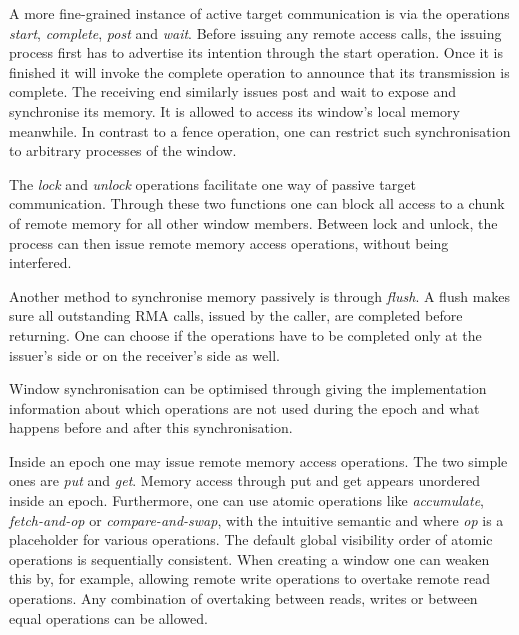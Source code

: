 \documentclass[a4paper, 10pt]{article}
\begin{document}
A more fine-grained instance of active target communication is via the operations \emph{start}, \emph{complete}, \emph{post} and \emph{wait}. Before issuing any remote access calls, the issuing process first has to advertise its intention through the start operation. Once it is finished it will invoke the complete operation to announce that its transmission is complete. The receiving end similarly issues post and wait to expose and synchronise its memory. It is allowed to access its window's local memory meanwhile. In contrast to a fence operation, one can restrict such synchronisation to arbitrary processes of the window.

The \emph{lock} and \emph{unlock} operations facilitate one way of passive target communication. Through these two functions one can block all access to a chunk of remote memory for all other window members. Between lock and unlock, the process can then issue remote memory access operations, without being interfered.

Another method to synchronise memory passively is through \emph{flush}. A flush makes sure all outstanding RMA calls, issued by the caller, are completed before returning. One can choose if the operations have to be completed only at the issuer's side or on the receiver's side as well.

Window synchronisation can be optimised through giving the implementation information about which operations are not used during the epoch and what happens before and after this synchronisation.

Inside an epoch one may issue remote memory access operations. The two simple ones are \emph{put} and \emph{get}. Memory access through put and get appears unordered inside an epoch.
Furthermore, one can use atomic operations like \emph{accumulate}, \emph{fetch-and-op} or \emph{compare-and-swap}, with the intuitive semantic and where \emph{op} is a placeholder for various operations. The default global visibility order of atomic operations is sequentially consistent. When creating a window one can weaken this by, for example, allowing remote write operations to overtake remote read operations. Any combination of overtaking between reads, writes or between equal operations can be allowed.
\end{document}
